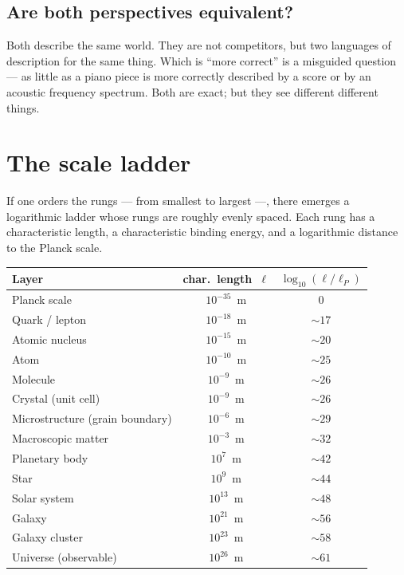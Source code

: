 \subsection*{Are both perspectives equivalent?}

Both describe the same world. They are not competitors, but two
languages of description for the same thing. Which is ``more
correct'' is a misguided question --- as little as a piano piece is
more correctly described by a score or by an acoustic frequency
spectrum. Both are exact; but they see different different things.

\section{The scale ladder}

If one orders the rungs --- from smallest to largest ---, there
emerges a logarithmic ladder whose rungs are roughly evenly spaced.
Each rung has a characteristic length, a characteristic binding
energy, and a logarithmic distance to the Planck scale.

\begin{center}
\small
\begin{tabular}{lcc}
\toprule
\textbf{Layer} & \textbf{char.~length}~$\ell$ & $\log_{10}(\ell/\ell_{P})$ \\
\midrule
Planck scale         & $10^{-35}$~m & $0$ \\
Quark / lepton       & $10^{-18}$~m & $\sim 17$ \\
Atomic nucleus       & $10^{-15}$~m & $\sim 20$ \\
Atom                 & $10^{-10}$~m & $\sim 25$ \\
Molecule             & $10^{-9}$~m  & $\sim 26$ \\
Crystal (unit cell)  & $10^{-9}$~m  & $\sim 26$ \\
Microstructure (grain boundary) & $10^{-6}$~m & $\sim 29$ \\
Macroscopic matter   & $10^{-3}$~m  & $\sim 32$ \\
Planetary body       & $10^{7}$~m   & $\sim 42$ \\
Star                 & $10^{9}$~m   & $\sim 44$ \\
Solar system         & $10^{13}$~m  & $\sim 48$ \\
Galaxy               & $10^{21}$~m  & $\sim 56$ \\
Galaxy cluster       & $10^{23}$~m  & $\sim 58$ \\
Universe (observable) & $10^{26}$~m & $\sim 61$ \\
\bottomrule
\end{tabular}
\end{center}

